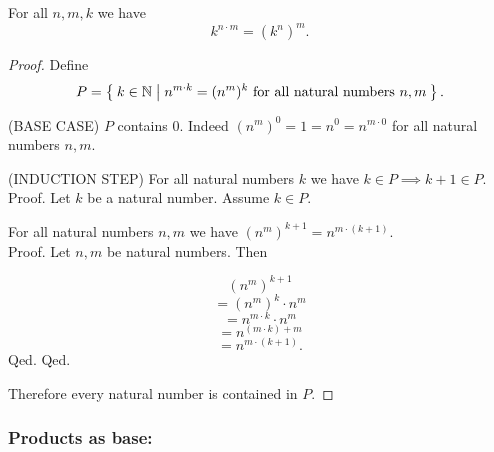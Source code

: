 \documentclass[../../arithmetic.tex]{subfiles}
\begin{document}
  \begin{forthel}
    \begin{proposition}\label{Arithmetic_01_04_531499}
      For all $n,m,k$ we have \[ k^{n \cdot m} = (k^{n})^{m}. \]
    \end{proposition}
    \begin{proof}
      Define \[ P = \Set{k \in \mathbb{N} | \text{$n^{m \cdot k} = (n^{m})^{k}$ for all natural numbers $n,m$}}. \]

      (BASE CASE) $P$ contains $0$.
      Indeed $(n^{m})^{0} = 1 = n^{0} = n^{m \cdot 0}$ for all natural numbers $n,m$.

      (INDUCTION STEP) For all natural numbers $k$ we have $k \in P \implies k + 1 \in P$. \\
      Proof.
        Let $k$ be a natural number.
        Assume $k \in P$.

        For all natural numbers $n,m$ we have $(n^{m})^{k + 1} =
        n^{m \cdot (k + 1)}$. \\
        Proof.
          Let $n,m$ be natural numbers.
          Then

          \[   (n^{m})^{k + 1} \]
          \[ = (n^{m})^{k} \cdot n^{m} \]   %
          \[ = n^{m \cdot k} \cdot n^{m} \] %
          \[ = n^{(m \cdot k) + m} \]       %
          \[ = n^{m \cdot (k + 1)}. \]      %
        Qed.
      Qed.

      Therefore every natural number is contained in $P$.
    \end{proof}
  \end{forthel}


  \subsubsection*{Products as base:}
\end{document}
